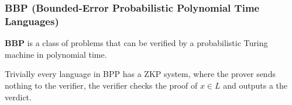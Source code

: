 \subsubsection{BBP (Bounded-Error Probabilistic Polynomial Time Languages)}
\label{label:bpp}

\textbf{BBP} is a class of problems that can be verified by a probabilistic Turing machine in polynomial time.

Trivially every language in BPP has a ZKP system, where the prover sends nothing to the verifier, the verifier checks the proof of $x \in L$ and outputs a the verdict. %

